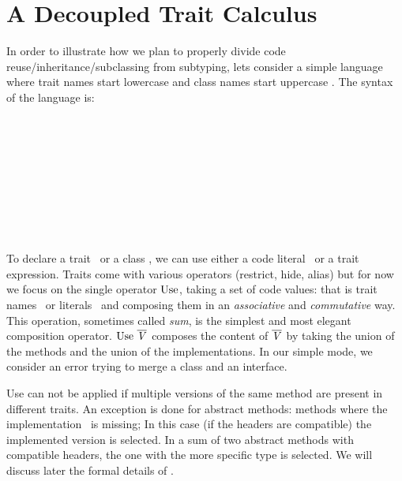 \section{A Decoupled Trait Calculus}
In order to illustrate how we plan to properly divide code reuse/inheritance/subclassing from subtyping,
lets consider a simple language where trait names start lowercase \mt
and class names start uppercase \mC.  
The syntax of the language is:

\begin{bnf}
\prodFull{}\\
\prodFull{}\\
\prodFull{}\\
\prodFull{}\\
\prodFull{}\\
\prodFull{}\\

\prodFull{}\\
\prodFull{}\\
\end{bnf}

To declare a trait \mTD\ or a class \mCD, we can use either a code literal \mL\ or a trait
expression.  Traits come with various operators (restrict, hide,
alias) but for now we focus on the single operator 
$\use$, taking a set
of code values: that is trait names \mt\ or literals \mL\ and composing them in an \emph{associative}
and \emph{commutative} way.  This operation, sometimes called \emph{sum}, is the simplest and most elegant
composition operator.  $\use\ \overline\mV$ composes the content of $\overline{\mathit{V}}$
by taking the union of the methods and the union of the implementations.
In our simple mode, we consider an error trying to merge a class and an interface.

Use can not be applied if multiple versions of the same method are
present in different traits.  An exception is done for abstract methods:
methods where the implementation \me\ is missing; In this case (if the
headers are compatible) the implemented version is selected.  In a sum
of two abstract methods with compatible headers, the one with the more
specific type is selected. We will discuss later the formal details of
\use.

